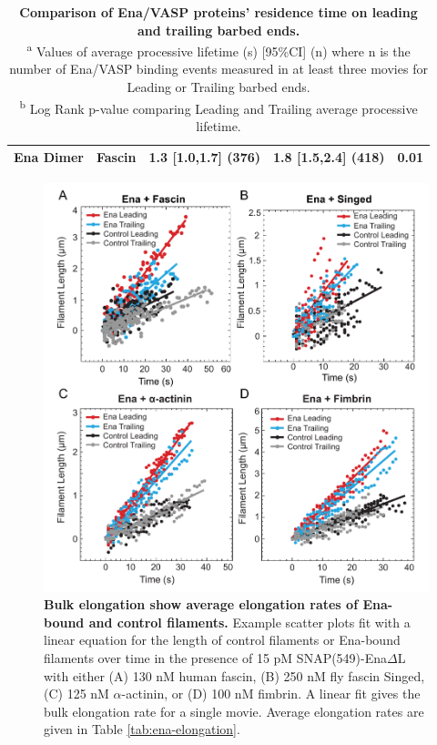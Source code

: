 \begin{table}[hbtp]
\begin{tabulary}{0.7\textwidth}{C C C C C}
Ena\hspace{0.3cm} Dimer & Fascin & 1.3\hspace{0.5cm} [1.0,1.7] (376) & 1.8\hspace{1.0cm} [1.5,2.4]\hspace{0.3cm} (418) & 0.01 \\
\bottomrule
\end{tabulary}
\caption[Comparison of Ena/VASP proteins' residence time on leading and trailing barbed ends.]{\textbf{Comparison of Ena/VASP proteins' residence time on leading and trailing barbed ends.} \\
   \textsuperscript{a} Values of average processive lifetime (s) [95\%CI] (n) where n is the number of Ena/VASP binding events measured in at least three movies for Leading or Trailing barbed ends.\\
   \textsuperscript{b} Log Rank p-value comparing Leading and Trailing average processive lifetime. \\}
\label{tab:ena-processive}
\end{table}

\begin{figure}
\centering
\includegraphics[width=14cm]{img/ch02/bulk_elongation_thesis.pdf}
\caption[Bulk elongation shows average elongation rates of Ena-bound and control filaments.]{\textbf{Bulk elongation show average elongation rates of Ena-bound and control filaments.} Example scatter plots fit with a linear equation for the length of control filaments or Ena-bound filaments over time in the presence of 15 pM SNAP(549)-Ena$\Delta$L with either (A) 130 nM human fascin, (B) 250 nM fly fascin Singed, (C) 125 nM $\alpha$-actinin, or (D) 100 nM fimbrin. A linear fit gives the bulk elongation rate for a single movie. Average elongation rates are given in Table \ref{tab:ena-elongation}.}
\label{fig:bulk-elongation}
\end{figure}

